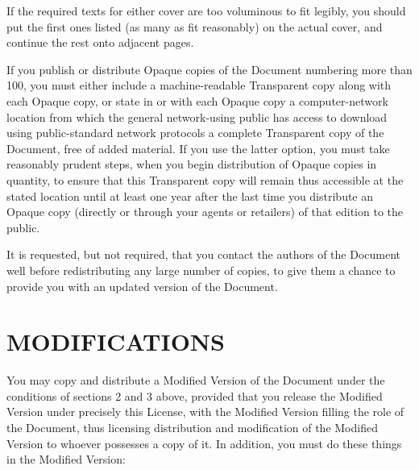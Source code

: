 \documentclass[a4paper,12pt]{book}
\theoremstyle{mes_exemples}	\newtheorem{exemple}[numtho]{Exemple}
\theoremstyle{mes_tho}
\begin{document}
If the required texts for either cover are too voluminous to fit
legibly, you should put the first ones listed (as many as fit
reasonably) on the actual cover, and continue the rest onto adjacent
pages.

If you publish or distribute Opaque copies of the Document numbering
more than 100, you must either include a machine-readable Transparent
copy along with each Opaque copy, or state in or with each Opaque copy
a computer-network location from which the general network-using
public has access to download using public-standard network protocols
a complete Transparent copy of the Document, free of added material.
If you use the latter option, you must take reasonably prudent steps,
when you begin distribution of Opaque copies in quantity, to ensure
that this Transparent copy will remain thus accessible at the stated
location until at least one year after the last time you distribute an
Opaque copy (directly or through your agents or retailers) of that
edition to the public.

It is requested, but not required, that you contact the authors of the
Document well before redistributing any large number of copies, to give
them a chance to provide you with an updated version of the Document.

\section{MODIFICATIONS}

You may copy and distribute a Modified Version of the Document under
the conditions of sections 2 and 3 above, provided that you release
the Modified Version under precisely this License, with the Modified
Version filling the role of the Document, thus licensing distribution
and modification of the Modified Version to whoever possesses a copy
of it.  In addition, you must do these things in the Modified Version:
\end{document}
